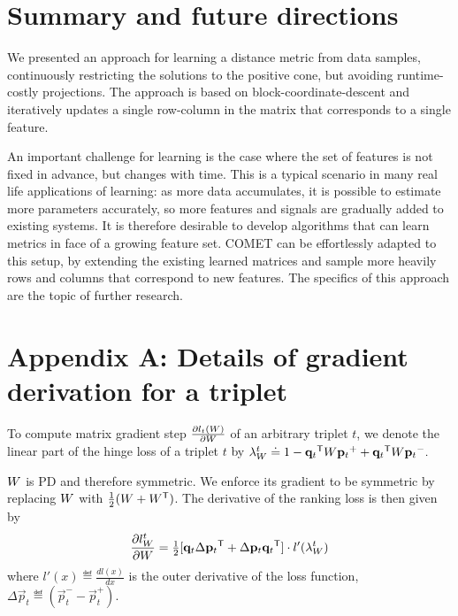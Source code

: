 \documentclass{article}
\begin{document}
\section{Summary and future directions}
We presented an approach for learning a distance metric from data samples, continuously restricting the solutions to the positive cone, but avoiding runtime-costly projections. The approach is based on block-coordinate-descent and iteratively updates a single row-column in the matrix that corresponds to a single feature. 

An important challenge for learning is the case where the set of features is not fixed in advance, but changes with time. This is a typical scenario in many real life applications of learning: as more data accumulates, it is possible to estimate more parameters accurately, so more features and signals are gradually added to existing systems. It is therefore desirable to develop algorithms that can learn metrics in face of a growing feature set. COMET can be effortlessly adapted to this setup, by extending the existing learned matrices and sample more heavily rows and columns that correspond to new features. The specifics of this approach are the topic of further research.


\appendix
\section*{Appendix A: Details of gradient derivation for a triplet}
\label{appendix-grad}

To compute matrix gradient step $\frac{\partial {l_t ({W})}}{\partial {W}}$ of an arbitrary triplet $t$, we denote the linear part of the hinge loss of a triplet $t$ by $\lambda_{W}^t \doteq 
1-{{\mathbf{q}}_{{t}}}{}^\mathsf{T} {W} {{\mathbf{p}}_{{t}}}^{+} + {{\mathbf{q}}_{{t}}}{}^\mathsf{T}{W}{{\mathbf{p}}_{{t}}}^{-}.$

${W}$ is PD and therefore symmetric. We enforce its gradient to be symmetric by replacing ${W}$ with $\tfrac{1}{2}({W} + {W}{}^\mathsf{T})$.
The derivative of the ranking loss is then given by
\begin{equation}
\frac{\partial {l_{{W}}^{t}}}{\partial {W}} = \tfrac{1}{2}[\mathbf{q}_{t}\Delta\mathbf{p}_{t}{}^\mathsf{T}  + \Delta\mathbf{p}_{t}\mathbf{q}_{t}{}^\mathsf{T}]\cdot {l'}(\lambda_{W}^t)
\label{dlossranking}
\end{equation} where $l'(x) \eqdef \frac{d{l(x)}}{dx}$ is the outer derivative of the loss function, $\Delta\vec{p}_{t} \eqdef (\vec{p}_{t}^{-} - \vec{p}_{t}^{+})$.
\end{document}
